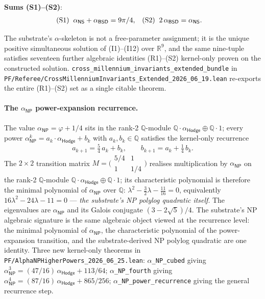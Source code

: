 \documentclass[11pt,a4paper]{amsart}
\theoremstyle{plain}
\theoremstyle{definition}
\begin{document}
\noindent\textbf{Sums \textup{(S1)--(S2)}}:
\begin{align*}
\textup{(S1)}\;\; \alpha_{\textsf{NS}} + \alpha_{\textsf{BSD}}  &= 9\pi/4,&
\textup{(S2)}\;\; 2\,\alpha_{\textsf{BSD}}     &= \alpha_{\textsf{NS}}.
\end{align*}

The substrate's $\alpha$-skeleton is not a free-parameter assignment; it is the unique positive simultaneous solution of (I1)--(I12) over $\mathbb{R}^9$, and the same nine-tuple satisfies seventeen further algebraic identities (R1)--(S2) kernel-only proven on the constructed solution. \texttt{cross\_millennium\_invariants\_extended\_bundle} in \texttt{PF/Referee/CrossMillenniumInvariants\_Extended\_2026\_06\_19.lean} re-exports the entire (R1)--(S2) set as a single citable theorem.

\paragraph{The $\alpha_{\textsf{NP}}$ power-expansion recurrence.} The value $\alpha_{\textsf{NP}} = \varphi + 1/4$ sits in the rank-2 $\mathbb{Q}$-module $\mathbb{Q}\cdot\alpha_{\textsf{Hodge}}\oplus\mathbb{Q}\cdot 1$; every power $\alpha_{\textsf{NP}}^{k} = a_k\cdot\alpha_{\textsf{Hodge}} + b_k$ with $a_k, b_k \in \mathbb{Q}$ satisfies the kernel-only recurrence
\[
a_{k+1} = \tfrac{5}{4}\,a_k + b_k,\qquad b_{k+1} = a_k + \tfrac{1}{4}\,b_k.
\]
The $2\times 2$ transition matrix $M = \bigl(\begin{smallmatrix}5/4 & 1\\ 1 & 1/4\end{smallmatrix}\bigr)$ realises multiplication by $\alpha_{\textsf{NP}}$ on the rank-2 $\mathbb{Q}$-module $\mathbb{Q}\cdot\alpha_{\textsf{Hodge}}\oplus\mathbb{Q}\cdot 1$; its characteristic polynomial is therefore the minimal polynomial of $\alpha_{\textsf{NP}}$ over $\mathbb{Q}$: $\lambda^2 - \tfrac{3}{2}\lambda - \tfrac{11}{16} = 0$, equivalently $16\lambda^2 - 24\lambda - 11 = 0$ --- \emph{the substrate's NP polylog quadratic itself}. The eigenvalues are $\alpha_{\textsf{NP}}$ and its Galois conjugate $(3 - 2\sqrt{5})/4$. The substrate's NP algebraic signature is the same algebraic object viewed at the recurrence level: the minimal polynomial of $\alpha_{\textsf{NP}}$, the characteristic polynomial of the power-expansion transition, and the substrate-derived NP polylog quadratic are one identity. Three new kernel-only theorems in \texttt{PF/AlphaNPHigherPowers\_2026\_06\_25.lean}: \texttt{$\alpha$\_NP\_cubed} giving $\alpha_{\textsf{NP}}^{3} = (47/16)\,\alpha_{\textsf{Hodge}} + 113/64$; \texttt{$\alpha$\_NP\_fourth} giving $\alpha_{\textsf{NP}}^{4} = (87/16)\,\alpha_{\textsf{Hodge}} + 865/256$; \texttt{$\alpha$\_NP\_power\_recurrence} giving the general recurrence step.
\end{document}
